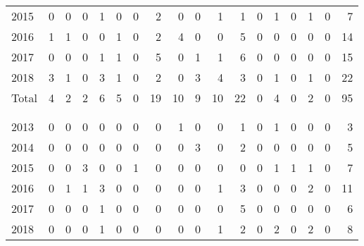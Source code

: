 \documentclass[a4paper]{article}
\begin{document}
\begin{table}
{\begin{tabular}[t]{lrrrrrrrrrrrrrrrrr}
\hspace{1em}\hspace{1em}2015 & 0 & 0 & 0 & 1 & 0 & 0 & 2 & 0 & 0 & 1 & 1 & 0 & 1 & 0 & 1 & 0 & 7\\
\hspace{1em}\hspace{1em}2016 & 1 & 1 & 0 & 0 & 1 & 0 & 2 & 4 & 0 & 0 & 5 & 0 & 0 & 0 & 0 & 0 & 14\\
\hspace{1em}\hspace{1em}2017 & 0 & 0 & 0 & 1 & 1 & 0 & 5 & 0 & 1 & 1 & 6 & 0 & 0 & 0 & 0 & 0 & 15\\
\hspace{1em}\hspace{1em}2018 & 3 & 1 & 0 & 3 & 1 & 0 & 2 & 0 & 3 & 4 & 3 & 0 & 1 & 0 & 1 & 0 & 22\\
\hspace{1em}\hspace{1em}Total & 4 & 2 & 2 & 6 & 5 & 0 & 19 & 10 & 9 & 10 & 22 & 0 & 4 & 0 & 2 & 0 & 95\\
\addlinespace[0.3em]
\multicolumn{18}{l}{\textbf{Withdrawal}}\\
\addlinespace[0.3em]
\multicolumn{18}{l}{\textbf{Extern}}\\
\hspace{1em}\hspace{1em}2013 & 0 & 0 & 0 & 0 & 0 & 0 & 0 & 1 & 0 & 0 & 1 & 0 & 1 & 0 & 0 & 0 & 3\\
\hspace{1em}\hspace{1em}2014 & 0 & 0 & 0 & 0 & 0 & 0 & 0 & 0 & 3 & 0 & 2 & 0 & 0 & 0 & 0 & 0 & 5\\
\hspace{1em}\hspace{1em}2015 & 0 & 0 & 3 & 0 & 0 & 1 & 0 & 0 & 0 & 0 & 0 & 0 & 1 & 1 & 1 & 0 & 7\\
\hspace{1em}\hspace{1em}2016 & 0 & 1 & 1 & 3 & 0 & 0 & 0 & 0 & 0 & 1 & 3 & 0 & 0 & 0 & 2 & 0 & 11\\
\hspace{1em}\hspace{1em}2017 & 0 & 0 & 0 & 1 & 0 & 0 & 0 & 0 & 0 & 0 & 5 & 0 & 0 & 0 & 0 & 0 & 6\\
\hspace{1em}\hspace{1em}2018 & 0 & 0 & 0 & 1 & 0 & 0 & 0 & 0 & 0 & 1 & 2 & 0 & 2 & 0 & 2 & 0 & 8\\

\end{tabular}}
\end{table}
\end{document}
